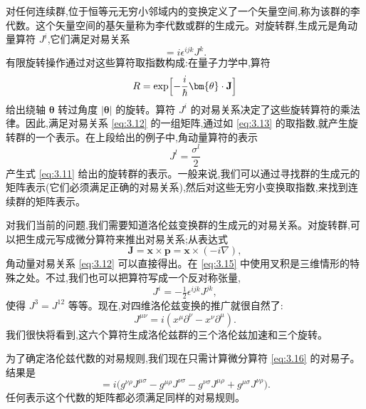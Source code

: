 对任何连续群,位于恒等元无穷小邻域内的变换定义了一个矢量空间,称为该群的李代数。这个矢量空间的基矢量称为李代数或群的生成元。对旋转群,生成元是角动量算符 $J^i$,它们满足对易关系
\begin{equation}
  [J^i, J^j] = i\epsilon^{ijk}J^k .
  \label{eq:3.12}
\end{equation}
有限旋转操作通过对这些算符取指数构成:在量子力学中,算符
\begin{equation}
  R = \exp\Bigl[-\frac{i}{\hbar}\bm{\theta}\cdot\mathbf{J}\Bigr]
  \label{eq:3.13}
\end{equation}
给出绕轴 $\bm{\theta}$ 转过角度 $|\bm{\theta}|$ 的旋转。算符 $J^i$ 的对易关系决定了这些旋转算符的乘法律。因此,满足对易关系 \eqref{eq:3.12} 的一组矩阵,通过如 \eqref{eq:3.13} 的取指数,就产生旋转群的一个表示。在上段给出的例子中,角动量算符的表示
\begin{equation}
  J^l = \frac{\sigma^l}{2}
  \label{eq:3.14}
\end{equation}
产生式 \eqref{eq:3.11} 给出的旋转群的表示。一般来说,我们可以通过寻找群的生成元的矩阵表示(它们必须满足正确的对易关系),然后对这些无穷小变换取指数,来找到连续群的矩阵表示。

对我们当前的问题,我们需要知道洛伦兹变换群的生成元的对易关系。对旋转群,可以把生成元写成微分算符来推出对易关系;从表达式
\begin{equation}
  \mathbf{J} = \mathbf{x}\times\mathbf{p} = \mathbf{x}\times(-i\nabla),
  \label{eq:3.15}
\end{equation}
角动量对易关系 \eqref{eq:3.12} 可以直接得出。在 \eqref{eq:3.15} 中使用叉积是三维情形的特殊之处。不过,我们也可以把算符写成一个反对称张量,
\begin{equation}
  J^i = -\tfrac{1}{2}\epsilon^{ijk}J^{jk},
\end{equation}
使得 $J^3 = J^{12}$ 等等。现在,对四维洛伦兹变换的推广就很自然了:
\begin{equation}
  J^{\mu\nu} = i(x^\mu\partial^\nu - x^\nu\partial^\mu).
  \label{eq:3.16}
\end{equation}
我们很快将看到,这六个算符生成洛伦兹群的三个洛伦兹加速和三个旋转。

为了确定洛伦兹代数的对易规则,我们现在只需计算微分算符 \eqref{eq:3.16} 的对易子。结果是
\begin{equation}
  [J^{\mu\nu}, J^{\rho\sigma}] = i\bigl( g^{\nu\rho}J^{\mu\sigma}
    - g^{\mu\rho}J^{\nu\sigma} - g^{\nu\sigma}J^{\mu\rho}
    + g^{\mu\sigma}J^{\nu\rho} \bigr).
  \label{eq:3.17}
\end{equation}
任何表示这个代数的矩阵都必须满足同样的对易规则。

